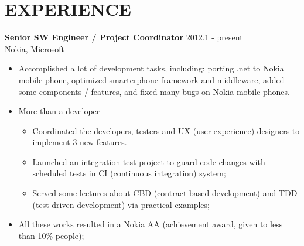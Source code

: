 
\section{EXPERIENCE}
\textbf{Senior SW Engineer / Project Coordinator} \hfill 2012.1 - present \\
        Nokia, Microsoft
        \begin{itemize}  \itemsep -2pt %
        \item Accomplished a lot of development tasks, including:
            porting .net to Nokia mobile phone, optimized smarterphone framework and middleware, added some components / features,
            and fixed many bugs on Nokia mobile phones.
        \item More than a developer 
            \begin{itemize}  \itemsep -2pt
                \item Coordinated the developers, testers and UX (user experience) designers to implement 3 new features.
                \item Launched an integration test project to guard code changes
                with scheduled tests in CI (continuous integration) system;
                \item Served some lectures about CBD (contract based development) and
                TDD (test driven development) via practical examples;
            \end{itemize}
        \item All these works resulted in a Nokia AA (achievement award, given to less than 10\% people);
        \end{itemize}

